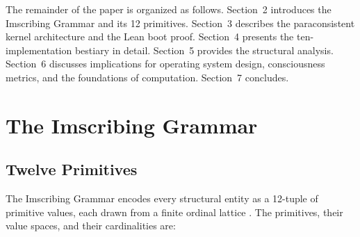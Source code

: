 \documentclass[12pt,a4paper]{article}
\begin{document}
The remainder of the paper is organized as follows. Section~2 introduces the Imscribing
Grammar and its 12 primitives. Section~3 describes the paraconsistent kernel architecture
and the Lean boot proof. Section~4 presents the ten-implementation bestiary in detail.
Section~5 provides the structural analysis. Section~6 discusses implications for operating
system design, consciousness metrics, and the foundations of computation. Section~7
concludes.

\section{The Imscribing Grammar}

\subsection{Twelve Primitives}

The Imscribing Grammar encodes every structural entity as a 12-tuple of primitive
values, each drawn from a finite ordinal lattice \cite{IG_primitives}. The primitives,
their value spaces, and their cardinalities are:
\end{document}
